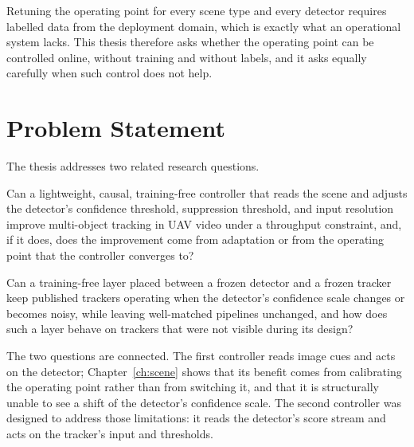 Retuning the operating point for every scene type and every detector requires labelled data from the deployment domain, which is exactly what an operational system lacks. This thesis therefore asks whether the operating point can be controlled online, without training and without labels, and it asks equally carefully when such control does not help.

\section{Problem Statement}
The thesis addresses two related research questions.

\begin{description}[leftmargin=0cm,style=nextline]
\item[RQ1: Scene-adaptive control of the detector.] Can a lightweight, causal, training-free controller that reads the scene and adjusts the detector's confidence threshold, suppression threshold, and input resolution improve multi-object tracking in UAV video under a throughput constraint, and, if it does, does the improvement come from adaptation or from the operating point that the controller converges to?
\item[RQ2: Score-driven control of the tracker.] Can a training-free layer placed between a frozen detector and a frozen tracker keep published trackers operating when the detector's confidence scale changes or becomes noisy, while leaving well-matched pipelines unchanged, and how does such a layer behave on trackers that were not visible during its design?
\end{description}

The two questions are connected. The first controller reads image cues and acts on the detector; Chapter~\ref{ch:scene} shows that its benefit comes from calibrating the operating point rather than from switching it, and that it is structurally unable to see a shift of the detector's confidence scale. The second controller was designed to address those limitations: it reads the detector's score stream and acts on the tracker's input and thresholds.

